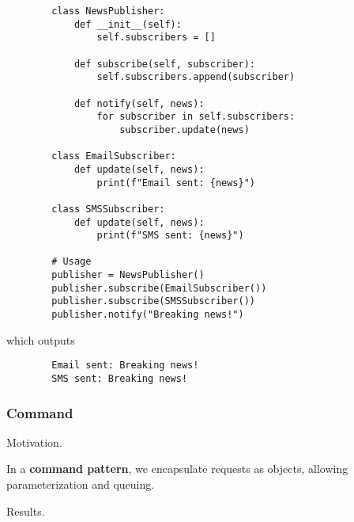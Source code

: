     \begin{example}
      \begin{lstlisting}
        class NewsPublisher:
            def __init__(self):
                self.subscribers = []
            
            def subscribe(self, subscriber):
                self.subscribers.append(subscriber)
            
            def notify(self, news):
                for subscriber in self.subscribers:
                    subscriber.update(news)

        class EmailSubscriber:
            def update(self, news):
                print(f"Email sent: {news}")

        class SMSSubscriber:
            def update(self, news):
                print(f"SMS sent: {news}")

        # Usage
        publisher = NewsPublisher()
        publisher.subscribe(EmailSubscriber())
        publisher.subscribe(SMSSubscriber())
        publisher.notify("Breaking news!")
      \end{lstlisting}

      which outputs 
      \begin{lstlisting}
        Email sent: Breaking news!
        SMS sent: Breaking news!
      \end{lstlisting}
    \end{example}

  \subsubsection{Command} 

    Motivation. 

    \begin{definition}
      In a \textbf{command pattern}, we encapsulate requests as objects, allowing parameterization and queuing.
    \end{definition}

    Results. 

